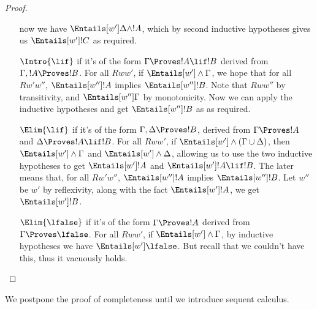 \documentclass[../../../include/open-logic-section]{subfiles}
\begin{document}
\begin{proof}
\begin{enumerate}
      now we have $\Entails[w'] \Delta \land !A$, which by
      second inductive hypotheses gives us $\Entails[w'] !C$ as
      required.
    \item[$\Intro{\lif}$] if it's of the form $\Gamma \Proves !A \lif
      !B$ derived from $\Gamma, !A \Proves !B$. For all $R w w'$, if
      $\Entails[w'] \land\Gamma$, we hope that for all $R w' w''$,
      $\Entails[w''] !A$ implies $\Entails[w''] !B$. Note that $R w
      w''$ by transitivity, and $\Entails[w''] \Gamma$ by
      monotonicity. Now we can apply the inductive hypotheses and get
      $\Entails[w''] !B$ as as required.
    \item[$\Elim{\lif}$] if it's of the form $\Gamma, \Delta \Proves
      !B$, derived from $\Gamma \Proves !A$ and $\Delta \Proves !A
      \lif !B$. For all $R w w'$, if $\Entails[w'] \land(\Gamma \cup
      \Delta)$, then $\Entails[w'] \land\Gamma$ and $\Entails[w']
      \land\Delta$, allowing us to use the two inductive hypotheses to
      get $\Entails[w'] !A$ and $\Entails[w'] !A \lif !B$. The later
      means that, for all $R w' w''$, $\Entails[w''] !A$ implies
      $\Entails[w''] !B$. Let $w''$ be $w'$ by reflexivity, along with
      the fact $\Entails[w'] !A$, we get $\Entails[w'] !B$.
    \item[$\Elim{\lfalse}$] if it's of the form $\Gamma \Proves !A$
      derived from $\Gamma \Proves \lfalse$. For all $R w w'$, if
      $\Entails[w'] \land\Gamma$, by inductive hypotheses we have
      $\Entails[w'] \lfalse$. But recall that we couldn't have this,
      thus it vacuously holds.
  \end{enumerate}
\end{proof}

We postpone the proof of completeness until we introduce sequent
calculus.
\end{document}
